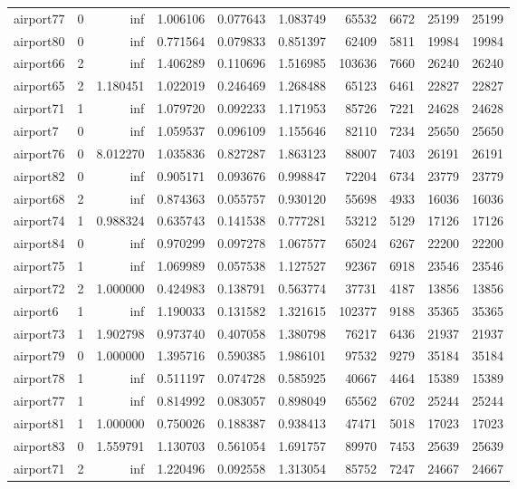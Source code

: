 \begin{longtable}{|l|r|r|r|r|r|r|r|r|r|}
airport77 & 0 & inf & 1.006106 & 0.077643 & 1.083749 & 65532 & 6672 & 25199 & 25199 \\
airport80 & 0 & inf & 0.771564 & 0.079833 & 0.851397 & 62409 & 5811 & 19984 & 19984 \\
airport66 & 2 & inf & 1.406289 & 0.110696 & 1.516985 & 103636 & 7660 & 26240 & 26240 \\
airport65 & 2 & 1.180451 & 1.022019 & 0.246469 & 1.268488 & 65123 & 6461 & 22827 & 22827 \\
airport71 & 1 & inf & 1.079720 & 0.092233 & 1.171953 & 85726 & 7221 & 24628 & 24628 \\
airport7 & 0 & inf & 1.059537 & 0.096109 & 1.155646 & 82110 & 7234 & 25650 & 25650 \\
airport76 & 0 & 8.012270 & 1.035836 & 0.827287 & 1.863123 & 88007 & 7403 & 26191 & 26191 \\
airport82 & 0 & inf & 0.905171 & 0.093676 & 0.998847 & 72204 & 6734 & 23779 & 23779 \\
airport68 & 2 & inf & 0.874363 & 0.055757 & 0.930120 & 55698 & 4933 & 16036 & 16036 \\
airport74 & 1 & 0.988324 & 0.635743 & 0.141538 & 0.777281 & 53212 & 5129 & 17126 & 17126 \\
airport84 & 0 & inf & 0.970299 & 0.097278 & 1.067577 & 65024 & 6267 & 22200 & 22200 \\
airport75 & 1 & inf & 1.069989 & 0.057538 & 1.127527 & 92367 & 6918 & 23546 & 23546 \\
airport72 & 2 & 1.000000 & 0.424983 & 0.138791 & 0.563774 & 37731 & 4187 & 13856 & 13856 \\
airport6 & 1 & inf & 1.190033 & 0.131582 & 1.321615 & 102377 & 9188 & 35365 & 35365 \\
airport73 & 1 & 1.902798 & 0.973740 & 0.407058 & 1.380798 & 76217 & 6436 & 21937 & 21937 \\
airport79 & 0 & 1.000000 & 1.395716 & 0.590385 & 1.986101 & 97532 & 9279 & 35184 & 35184 \\
airport78 & 1 & inf & 0.511197 & 0.074728 & 0.585925 & 40667 & 4464 & 15389 & 15389 \\
airport77 & 1 & inf & 0.814992 & 0.083057 & 0.898049 & 65562 & 6702 & 25244 & 25244 \\
airport81 & 1 & 1.000000 & 0.750026 & 0.188387 & 0.938413 & 47471 & 5018 & 17023 & 17023 \\
airport83 & 0 & 1.559791 & 1.130703 & 0.561054 & 1.691757 & 89970 & 7453 & 25639 & 25639 \\
airport71 & 2 & inf & 1.220496 & 0.092558 & 1.313054 & 85752 & 7247 & 24667 & 24667 \\

\end{longtable}
